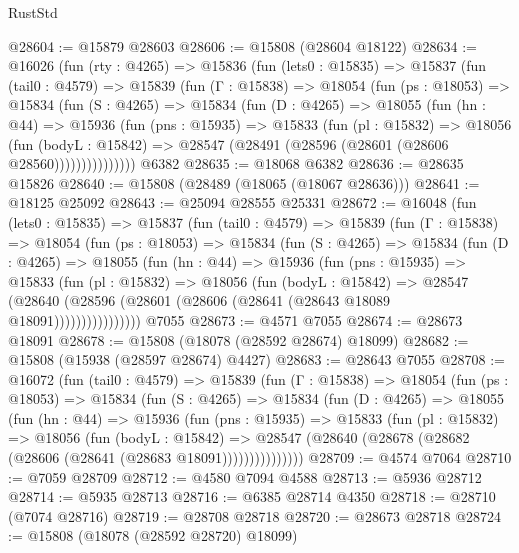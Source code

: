 \begin{lexlean}{RustStd}
\begin{coremodule}
@28604 := @15879 @28603
@28606 := @15808 (@28604 @18122)
@28634 := @16026
    (fun (rty : @4265) =>
    @15836
      (fun (lets0 : @15835) =>
      @15837
        (fun (tail0 : @4579) =>
        @15839
          (fun (Γ : @15838) =>
          @18054
            (fun (ps : @18053) =>
            @15834
              (fun (S : @4265) =>
              @15834
                (fun (D : @4265) =>
                @18055
                  (fun (hn : @44) =>
                  @15936
                    (fun (pns : @15935) =>
                    @15833
                      (fun (pl : @15832) =>
                      @18056
                        (fun (bodyL : @15842) =>
                        @28547 (@28491 (@28596 (@28601 (@28606 @28560)))))))))))))))
    @6382
@28635 := @18068 @6382
@28636 := @28635 @15826
@28640 := @15808 (@28489 (@18065 (@18067 @28636)))
@28641 := @18125 @25092
@28643 := @25094 @28555 @25331
@28672 := @16048
    (fun (lets0 : @15835) =>
    @15837
      (fun (tail0 : @4579) =>
      @15839
        (fun (Γ : @15838) =>
        @18054
          (fun (ps : @18053) =>
          @15834
            (fun (S : @4265) =>
            @15834
              (fun (D : @4265) =>
              @18055
                (fun (hn : @44) =>
                @15936
                  (fun (pns : @15935) =>
                  @15833
                    (fun (pl : @15832) =>
                    @18056
                      (fun (bodyL : @15842) =>
                      @28547
                        (@28640
                          (@28596 (@28601 (@28606 (@28641 (@28643 @18089 @18091))))))))))))))))
    @7055
@28673 := @4571 @7055
@28674 := @28673 @18091
@28678 := @15808 (@18078 (@28592 @28674) @18099)
@28682 := @15808 (@15938 (@28597 @28674) @4427)
@28683 := @28643 @7055
@28708 := @16072
    (fun (tail0 : @4579) =>
    @15839
      (fun (Γ : @15838) =>
      @18054
        (fun (ps : @18053) =>
        @15834
          (fun (S : @4265) =>
          @15834
            (fun (D : @4265) =>
            @18055
              (fun (hn : @44) =>
              @15936
                (fun (pns : @15935) =>
                @15833
                  (fun (pl : @15832) =>
                  @18056
                    (fun (bodyL : @15842) =>
                    @28547 (@28640 (@28678 (@28682 (@28606 (@28641 (@28683 @18091)))))))))))))))
@28709 := @4574 @7064
@28710 := @7059 @28709
@28712 := @4580 @7094 @4588
@28713 := @5936 @28712
@28714 := @5935 @28713
@28716 := @6385 @28714 @4350
@28718 := @28710 (@7074 @28716)
@28719 := @28708 @28718
@28720 := @28673 @28718
@28724 := @15808 (@18078 (@28592 @28720) @18099)

\end{coremodule}
\end{lexlean}
